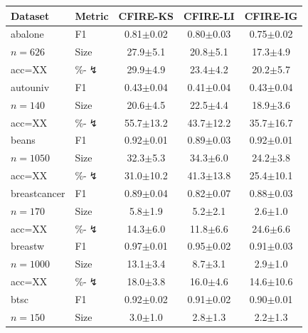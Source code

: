 \begin{tabular}{llccc}
\toprule
Dataset & Metric & CFIRE-KS & CFIRE-LI & CFIRE-IG \\
\midrule
abalone & F1 & 0.81{\scriptsize$\pm$0.02} & 0.80{\scriptsize$\pm$0.03} & 0.75{\scriptsize$\pm$0.02} \\
$n=626$ & Size & 27.9{\scriptsize$\pm$5.1} & 20.8{\scriptsize$\pm$5.1} & 17.3{\scriptsize$\pm$4.9} \\
acc=XX & \%-$\lightning$ & 29.9{\scriptsize$\pm$4.9} & 23.4{\scriptsize$\pm$4.2} & 20.2{\scriptsize$\pm$5.7} \\
\midrule
autouniv & F1 & 0.43{\scriptsize$\pm$0.04} & 0.41{\scriptsize$\pm$0.04} & 0.43{\scriptsize$\pm$0.04} \\
$n=140$ & Size & 20.6{\scriptsize$\pm$4.5} & 22.5{\scriptsize$\pm$4.4} & 18.9{\scriptsize$\pm$3.6} \\
acc=XX & \%-$\lightning$ & 55.7{\scriptsize$\pm$13.2} & 43.7{\scriptsize$\pm$12.2} & 35.7{\scriptsize$\pm$16.7} \\
\midrule
beans & F1 & 0.92{\scriptsize$\pm$0.01} & 0.89{\scriptsize$\pm$0.03} & 0.92{\scriptsize$\pm$0.01} \\
$n=1050$ & Size & 32.3{\scriptsize$\pm$5.3} & 34.3{\scriptsize$\pm$6.0} & 24.2{\scriptsize$\pm$3.8} \\
acc=XX & \%-$\lightning$ & 31.0{\scriptsize$\pm$10.2} & 41.3{\scriptsize$\pm$13.8} & 25.4{\scriptsize$\pm$10.1} \\
\midrule
breastcancer & F1 & 0.89{\scriptsize$\pm$0.04} & 0.82{\scriptsize$\pm$0.07} & 0.88{\scriptsize$\pm$0.03} \\
$n=170$ & Size & 5.8{\scriptsize$\pm$1.9} & 5.2{\scriptsize$\pm$2.1} & 2.6{\scriptsize$\pm$1.0} \\
acc=XX & \%-$\lightning$ & 14.3{\scriptsize$\pm$6.0} & 11.8{\scriptsize$\pm$6.6} & 24.6{\scriptsize$\pm$6.6} \\
\midrule
breastw & F1 & 0.97{\scriptsize$\pm$0.01} & 0.95{\scriptsize$\pm$0.02} & 0.91{\scriptsize$\pm$0.03} \\
$n=1000$ & Size & 13.1{\scriptsize$\pm$3.4} & 8.7{\scriptsize$\pm$3.1} & 2.9{\scriptsize$\pm$1.0} \\
acc=XX & \%-$\lightning$ & 18.0{\scriptsize$\pm$3.8} & 16.0{\scriptsize$\pm$4.6} & 14.6{\scriptsize$\pm$10.6} \\
\midrule
btsc & F1 & 0.92{\scriptsize$\pm$0.02} & 0.91{\scriptsize$\pm$0.02} & 0.90{\scriptsize$\pm$0.01} \\
$n=150$ & Size & 3.0{\scriptsize$\pm$1.0} & 2.8{\scriptsize$\pm$1.3} & 2.2{\scriptsize$\pm$1.3} \\

\end{tabular}
